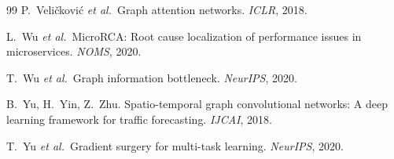 \documentclass[11pt,a4paper]{article}
\begin{document}
\begin{thebibliography}{99}
P.~Veli\v{c}kovi\'c \emph{et al.}\ Graph attention networks. \emph{ICLR},
2018.

L.~Wu \emph{et al.}\ MicroRCA: Root cause localization of performance issues
in microservices. \emph{NOMS}, 2020.

T.~Wu \emph{et al.}\ Graph information bottleneck. \emph{NeurIPS}, 2020.

B.~Yu, H.~Yin, Z.~Zhu. Spatio-temporal graph convolutional networks: A deep
learning framework for traffic forecasting. \emph{IJCAI}, 2018.

T.~Yu \emph{et al.}\ Gradient surgery for multi-task learning. \emph{NeurIPS},
2020.

\end{thebibliography}
\end{document}
